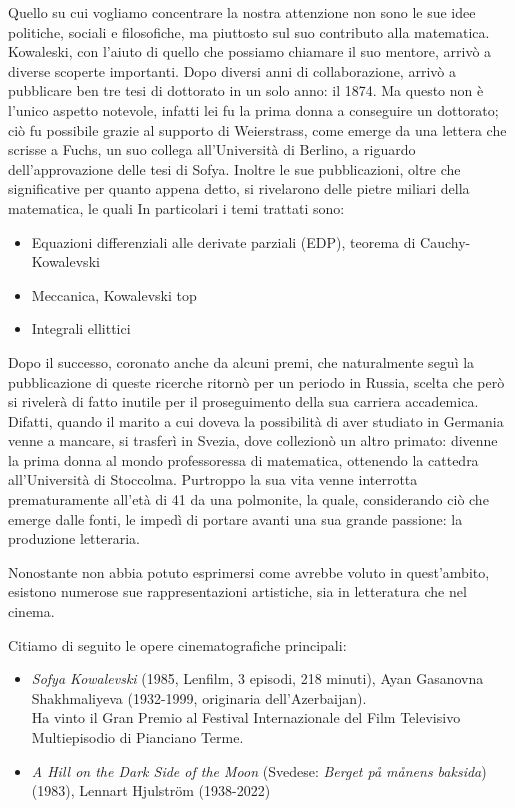 Quello su cui vogliamo concentrare la nostra attenzione non sono le sue idee politiche, sociali e filosofiche, ma piuttosto sul suo contributo alla matematica. Kowaleski, con l'aiuto di quello che possiamo chiamare il suo mentore, arrivò a diverse scoperte importanti. Dopo diversi anni di collaborazione, arrivò a pubblicare ben tre tesi di dottorato in un solo anno: il 1874. Ma questo non è l'unico aspetto notevole, infatti lei fu la prima donna a conseguire un dottorato; ciò fu possibile grazie al supporto di Weierstrass, come emerge da una lettera che scrisse a Fuchs, un suo collega all'Università di Berlino, a riguardo dell'approvazione delle tesi di Sofya. Inoltre le sue pubblicazioni, oltre che significative per quanto appena detto, si rivelarono delle pietre miliari della matematica, le quali 
In particolari i temi trattati sono:
\begin{itemize}
\item Equazioni differenziali alle derivate parziali (EDP), teorema di Cauchy-Kowalevski
\item Meccanica, Kowalevski top
\item Integrali ellittici
\end{itemize}


Dopo il successo, coronato anche da alcuni premi, che naturalmente seguì la pubblicazione di queste ricerche ritornò per un periodo in Russia, scelta che però si rivelerà di fatto inutile per il proseguimento della sua carriera accademica. Difatti, quando il marito a cui doveva la possibilità di aver studiato in Germania venne a mancare, si trasferì in Svezia, dove collezionò un altro primato: divenne la prima donna al mondo professoressa di matematica, ottenendo la cattedra all'Università di Stoccolma.
Purtroppo la sua vita venne interrotta prematuramente all'età di 41 da una polmonite, la quale, considerando ciò che emerge dalle fonti, le impedì di portare avanti una sua grande passione: la produzione letteraria.

Nonostante non abbia potuto esprimersi come avrebbe voluto in quest'ambito, esistono numerose sue rappresentazioni artistiche, sia in letteratura che nel cinema.

Citiamo di seguito le opere cinematografiche principali:
\begin{itemize}
\item \textit{Sofya Kowalevski} (1985, Lenfilm, 3 episodi, 218 minuti), Ayan Gasanovna Shakhmaliyeva (1932-1999,
originaria dell'Azerbaijan).\\
Ha vinto il Gran Premio al Festival Internazionale del Film Televisivo Multiepisodio di Pianciano Terme.
\item \textit{A Hill on the Dark Side of the Moon} (Svedese: \textit{Berget på månens baksida})(1983), Lennart Hjulström (1938-2022)
\end{itemize}

